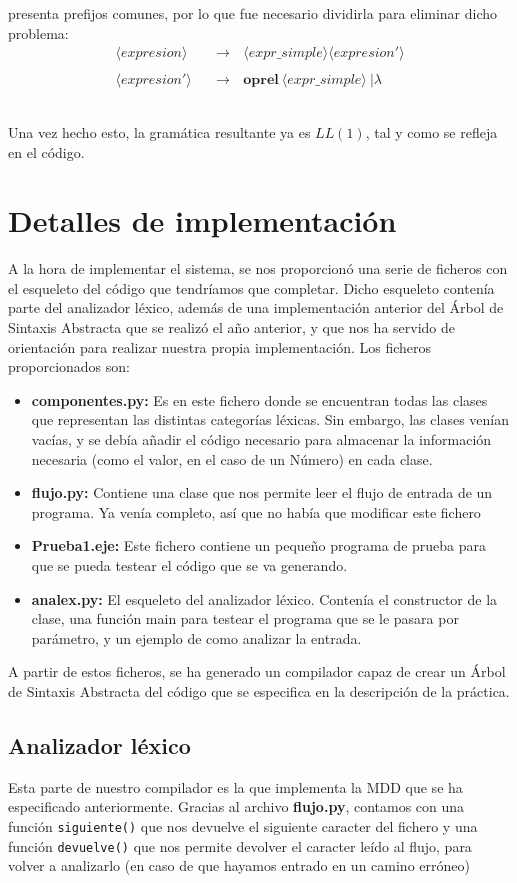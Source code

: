 \documentclass[11pt]{article}
\newcommand{\nt}[1]{\langle#1\rangle}
\newcommand{\regla}[2]{\nt{#1} \ \ \ &\rightarrow \ \ \ #2 \\}
\begin{document}
presenta prefijos comunes, por lo que fue necesario dividirla para eliminar dicho problema: \begin{align*}
\regla{expresion}{\nt{expr\_simple} \nt{expresion'}} \\
\regla{expresion'}{\textbf{oprel} \ \nt{expr\_simple} \ | \lambda} \\
\end{align*} \\
Una vez hecho esto, la gramática resultante ya es $LL(1)$, tal y como se refleja en el código.

\section{Detalles de implementación}
A la hora de implementar el sistema, se nos proporcionó una serie de ficheros con el esqueleto del código que tendríamos que completar. Dicho esqueleto contenía parte del analizador léxico, además de una implementación anterior del Árbol de Sintaxis Abstracta que se realizó el año anterior, y que nos ha servido de orientación para realizar nuestra propia implementación. Los ficheros proporcionados son: 
\begin{itemize}
	\item \textbf{componentes.py: } Es en este fichero donde se encuentran todas las clases que representan las distintas categorías léxicas. Sin embargo, las clases venían vacías, y se debía añadir el código necesario para almacenar la información necesaria (como el valor, en el caso de un Número) en cada clase.
	\item \textbf{flujo.py: } Contiene una clase que nos permite leer el flujo de entrada de un programa. Ya venía completo, así que no había que modificar este fichero
	\item \textbf{Prueba1.eje: } Este fichero contiene un pequeño programa de prueba para que se pueda testear el código que se va generando. 
	\item \textbf{analex.py: } El esqueleto del analizador léxico. Contenía el constructor de la clase, una función main para testear el programa que se le pasara por parámetro, y un ejemplo de como analizar la entrada.
\end{itemize}
A partir de estos ficheros, se ha generado un compilador capaz de crear un Árbol de Sintaxis Abstracta del código que se especifica en la descripción de la práctica.

\subsection{Analizador léxico}
Esta parte de nuestro compilador es la que implementa la MDD que se ha especificado anteriormente. Gracias al archivo \textbf{flujo.py}, contamos con una función \lstinline[language=Python]{siguiente()} que nos devuelve el siguiente caracter del fichero y una función \lstinline[language=Python]{devuelve()} que nos permite devolver el caracter leído al flujo, para volver a analizarlo (en caso de que hayamos entrado en un camino erróneo)
\end{document}
